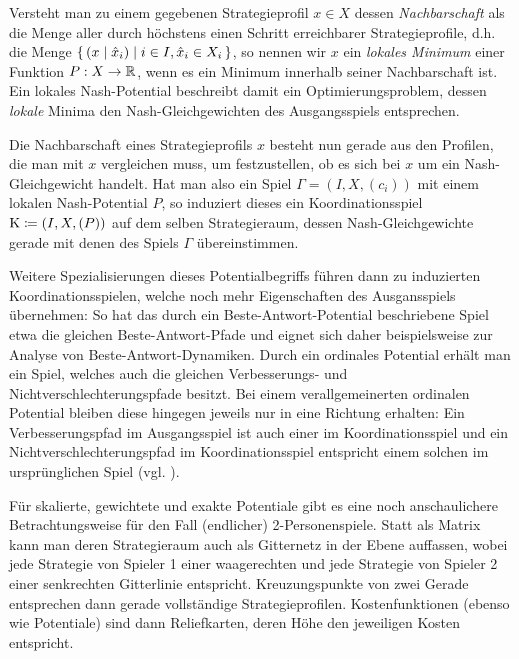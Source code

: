 Versteht man zu einem gegebenen Strategieprofil $x \in X$ dessen \emph{Nachbarschaft} als die Menge aller durch höchstens einen Schritt erreichbarer Strategieprofile, d.h. die Menge $\set{(x \mid \hat{x}_i) | i \in I, \hat{x}_i \in X_i}$, so nennen wir $x$ ein \emph{lokales Minimum} einer Funktion $P: X \to \mathbb{R}$, wenn es ein Minimum innerhalb seiner Nachbarschaft ist. Ein lokales Nash-Potential beschreibt damit ein Optimierungsproblem, dessen \emph{lokale} Minima den Nash-Gleichgewichten des Ausgangsspiels entsprechen.

Die Nachbarschaft eines Strategieprofils $x$ besteht nun gerade aus den Profilen, die man mit $x$ vergleichen muss, um festzustellen, ob es sich bei $x$ um ein Nash-Gleichgewicht handelt. Hat man also ein Spiel $\Gamma = (I, X, (c_i))$ mit einem lokalen Nash-Potential $P$, so induziert dieses ein Koordinationsspiel $\mathrm{K} \coloneqq (I, X, (P))$ auf dem selben Strategieraum, dessen Nash-Gleichgewichte gerade mit denen des Spiels $\Gamma$ übereinstimmen.

Weitere Spezialisierungen dieses Potentialbegriffs führen dann zu induzierten Koordinationsspielen, welche noch mehr Eigenschaften des Ausgansspiels übernehmen: So hat das durch ein Beste-Antwort-Potential beschriebene Spiel etwa die gleichen Beste-Antwort-Pfade und eignet sich daher beispielsweise zur Analyse von Beste-Antwort-Dynamiken. Durch ein ordinales Potential erhält man ein Spiel, welches auch die gleichen Verbesserungs- und Nichtverschlechterungspfade besitzt. Bei einem verallgemeinerten ordinalen Potential bleiben diese hingegen jeweils nur in eine Richtung erhalten: Ein Verbesserungspfad im Ausgangsspiel ist auch einer im Koordinationsspiel und ein Nichtverschlechterungspfad im Koordinationsspiel entspricht einem solchen im ursprünglichen Spiel (vgl. ).

Für skalierte, gewichtete und exakte Potentiale gibt es eine noch anschaulichere Betrachtungsweise für den Fall (endlicher) 2-Personenspiele. Statt als Matrix kann man deren Strategieraum auch als Gitternetz in der Ebene auffassen, wobei jede Strategie von Spieler 1 einer waagerechten und jede Strategie von Spieler 2 einer senkrechten Gitterlinie entspricht. Kreuzungspunkte von zwei Gerade entsprechen dann gerade vollständige Strategieprofilen. Kostenfunktionen (ebenso wie Potentiale) sind dann \glqq Reliefkarten\grqq{}, deren Höhe den jeweiligen Kosten entspricht. 

